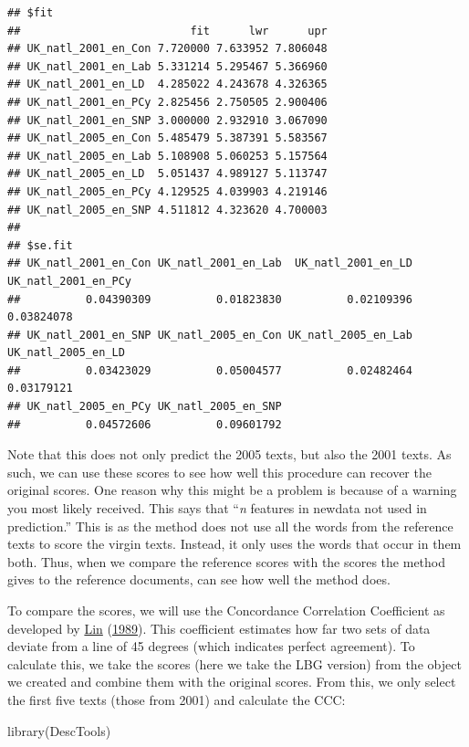 \documentclass[
]{book}
\newenvironment{Shaded}{\begin{snugshade}}{\end{snugshade}}
\newcommand{\FunctionTok}[1]{\textcolor[rgb]{0.00,0.00,0.00}{#1}}
\newcommand{\NormalTok}[1]{#1}
\begin{document}
\begin{verbatim}
## $fit
##                          fit      lwr      upr
## UK_natl_2001_en_Con 7.720000 7.633952 7.806048
## UK_natl_2001_en_Lab 5.331214 5.295467 5.366960
## UK_natl_2001_en_LD  4.285022 4.243678 4.326365
## UK_natl_2001_en_PCy 2.825456 2.750505 2.900406
## UK_natl_2001_en_SNP 3.000000 2.932910 3.067090
## UK_natl_2005_en_Con 5.485479 5.387391 5.583567
## UK_natl_2005_en_Lab 5.108908 5.060253 5.157564
## UK_natl_2005_en_LD  5.051437 4.989127 5.113747
## UK_natl_2005_en_PCy 4.129525 4.039903 4.219146
## UK_natl_2005_en_SNP 4.511812 4.323620 4.700003
## 
## $se.fit
## UK_natl_2001_en_Con UK_natl_2001_en_Lab  UK_natl_2001_en_LD UK_natl_2001_en_PCy 
##          0.04390309          0.01823830          0.02109396          0.03824078 
## UK_natl_2001_en_SNP UK_natl_2005_en_Con UK_natl_2005_en_Lab  UK_natl_2005_en_LD 
##          0.03423029          0.05004577          0.02482464          0.03179121 
## UK_natl_2005_en_PCy UK_natl_2005_en_SNP 
##          0.04572606          0.09601792
\end{verbatim}

Note that this does not only predict the 2005 texts, but also the 2001 texts. As such, we can use these scores to see how well this procedure can recover the original scores. One reason why this might be a problem is because of a warning you most likely received. This says that ``\emph{n} features in newdata not used in prediction.'' This is as the method does not use all the words from the reference texts to score the virgin texts. Instead, it only uses the words that occur in them both. Thus, when we compare the reference scores with the scores the method gives to the reference documents, can see how well the method does.

To compare the scores, we will use the Concordance Correlation Coefficient as developed by \protect\hyperlink{ref-Lin1989a}{Lin} (\protect\hyperlink{ref-Lin1989a}{1989}). This coefficient estimates how far two sets of data deviate from a line of 45 degrees (which indicates perfect agreement). To calculate this, we take the scores (here we take the LBG version) from the object we created and combine them with the original scores. From this, we only select the first five texts (those from 2001) and calculate the CCC:

\begin{Shaded}
\begin{Highlighting}[]
\FunctionTok{library}\NormalTok{(DescTools)}
\end{Highlighting}
\end{Shaded}
\end{document}
